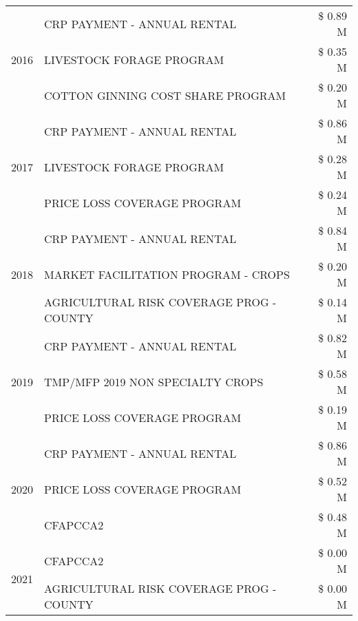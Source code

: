 \begin{tabular}{llr}
\cline{1-3}
\multirow[t]{3}{*}{2016} & CRP PAYMENT - ANNUAL RENTAL & \$ 0.89 M \\
 & LIVESTOCK FORAGE PROGRAM & \$ 0.35 M \\
 & COTTON GINNING COST SHARE PROGRAM & \$ 0.20 M \\
\cline{1-3}
\multirow[t]{3}{*}{2017} & CRP PAYMENT - ANNUAL RENTAL & \$ 0.86 M \\
 & LIVESTOCK FORAGE PROGRAM & \$ 0.28 M \\
 & PRICE LOSS COVERAGE PROGRAM & \$ 0.24 M \\
\cline{1-3}
\multirow[t]{3}{*}{2018} & CRP PAYMENT - ANNUAL RENTAL & \$ 0.84 M \\
 & MARKET FACILITATION PROGRAM - CROPS & \$ 0.20 M \\
 & AGRICULTURAL RISK COVERAGE PROG - COUNTY & \$ 0.14 M \\
\cline{1-3}
\multirow[t]{3}{*}{2019} & CRP PAYMENT - ANNUAL RENTAL & \$ 0.82 M \\
 & TMP/MFP 2019 NON SPECIALTY CROPS & \$ 0.58 M \\
 & PRICE LOSS COVERAGE PROGRAM & \$ 0.19 M \\
\cline{1-3}
\multirow[t]{3}{*}{2020} & CRP PAYMENT - ANNUAL RENTAL & \$ 0.86 M \\
 & PRICE LOSS COVERAGE PROGRAM & \$ 0.52 M \\
 & CFAPCCA2 & \$ 0.48 M \\
\cline{1-3}
\multirow[t]{2}{*}{2021} & CFAPCCA2 & \$ 0.00 M \\
 & AGRICULTURAL RISK COVERAGE PROG - COUNTY & \$ 0.00 M \\
\cline{1-3}
\bottomrule
\end{tabular}

